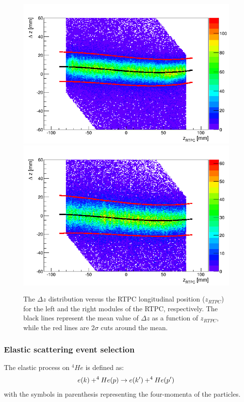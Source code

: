 \begin{itemize}
\begin{figure}[tbp]
\includegraphics[scale=0.34]{fig_rtpc/delta_z_z_l.png}
\includegraphics[scale=0.34]{fig_rtpc/delta_z_z_r.png}
\caption{The $\Delta z$ distribution versus the RTPC longitudinal position ($z_{RTPC}$) for the left and the right modules of the RTPC, respectively. The black lines represent the mean value of $\Delta z$ as a function of $z_{RTPC}$, while the red lines are 2$\sigma$ cuts around the mean.} 
\label{fig:rrtpc_delta_z}
\end{figure}  
\end{itemize}


\subsubsection{Elastic scattering event selection}
   The elastic process on $^{4}He$ is defined as:
\begin{equation}
\centering
e(k) + ^{4}He(p) \rightarrow e(k') + ^{4}He(p')
\end{equation}
with the symbols in parenthesis representing the four-momenta of the particles. 

